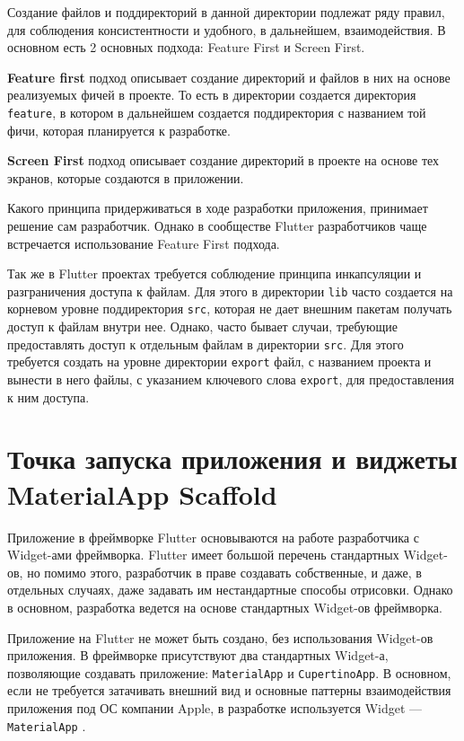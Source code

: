 Создание файлов и поддиректорий в данной директории подлежат ряду правил,
для соблюдения консистентности и удобного, в дальнейшем, взаимодействия.
В основном есть 2 основных подхода: Feature First и Screen First.\par
\textbf{Feature first} подход описывает создание директорий
и файлов в них на основе реализуемых фичей в проекте.
То есть в директории создается директория \texttt{feature},
в котором в дальнейшем создается поддиректория с названием той фичи,
которая планируется к разработке.\par
\textbf{Screen First} подход описывает создание директорий
в проекте на основе тех экранов, которые создаются в приложении.\par
Какого принципа придерживаться в ходе разработки приложения,
принимает решение сам разработчик.
Однако в сообществе Flutter разработчиков чаще
встречается использование Feature First подхода.\par
Так же в Flutter проектах требуется соблюдение принципа инкапсуляции
и разграничения доступа к файлам.
Для этого в директории \texttt{lib} часто создается
на корневом уровне поддиректория \texttt{src},
которая не дает внешним пакетам получать доступ к файлам внутри нее.
Однако, часто бывает случаи, требующие предоставлять доступ
к отдельным файлам в директории \texttt{src}.
Для этого требуется создать на уровне директории \texttt{export} файл,
с названием проекта и вынести в него файлы,
с указанием ключевого слова \texttt{export}, для предоставления к ним доступа.

\clearpage

\section{Точка запуска приложения и виджеты MaterialApp Scaffold}

Приложение в фреймворке Flutter основываются на работе разработчика
с Widget-ами фреймворка.
Flutter имеет большой перечень стандартных Widget-ов,
но помимо этого, разработчик в праве создавать собственные,
и даже, в отдельных случаях, даже задавать им нестандартные способы отрисовки.
Однако в основном, разработка ведется на основе
стандартных Widget-ов фреймворка.\par
Приложение на Flutter не может быть создано,
без использования Widget-ов приложения.
В фреймворке присутствуют два стандартных Widget-а,
позволяющие создавать приложение: \texttt{MaterialApp} и \texttt{CupertinoApp}.
В основном, если не требуется затачивать внешний вид
и основные паттерны взаимодействия приложения под ОС компании Apple,
в разработке используется Widget --- \texttt{MaterialApp}
.

